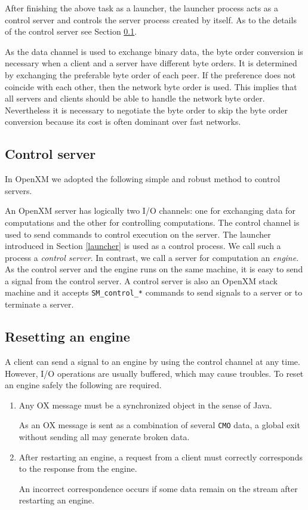 After finishing the above task as a launcher, the launcher process
acts as a control server and controls the server process created by
itself. As to the details of the control server see Section \ref{control}.

As the data channel is used to exchange binary data,
the byte order conversion is necessary when a
client and a server have different byte orders. It is determined by
exchanging the preferable byte order of each peer. If the preference
does not coincide with each other,
then the network byte order is used.
This implies that all servers and clients should be able to
handle the network byte
order. Nevertheless it is necessary to negotiate the byte order to
skip the byte order conversion because its cost is often dominant over
fast networks.


\subsection{Control server}
\label{control}
In OpenXM we adopted the following simple and robust method to 
control servers.

An OpenXM server has logically two I/O channels: one for exchanging
data for computations and the other for controlling computations. The
control channel is used to send commands to control execution on the
server. The launcher introduced in Section \ref{launcher}
is used as a control process. We call such a process a {\it
control server}. In contrast, we call a server for computation an {\it
engine}. As the control server and the engine runs on the
same machine, it is easy to send a signal from the control server. 
A control server is also an
OpenXM stack machine and it accepts {\tt SM\_control\_*} commands
to send signals to a server or to terminate a server.

\subsection{Resetting an engine}

A client can send a signal to an engine by using the control channel 
at any time. However, I/O operations are usually buffered,
which may cause troubles.
To reset an engine safely the following are required.

\begin{enumerate}
\item Any OX message must be a synchronized object in the sense of Java.

As an OX message is sent as a combination of several {\tt CMO}
data, a global exit without sending all may generate broken data.

\item After restarting an engine, a request from a client 
must correctly corresponds to the response from the engine.

An incorrect correspondence occurs if some data remain on the stream
after restarting an engine.
\end{enumerate}

